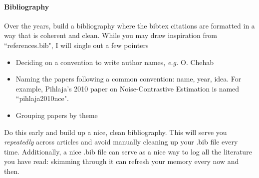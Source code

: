 \paragraph{Bibliography} Over the years, build a bibliography where the bibtex citations are formatted in a way that is coherent and clean. While you may draw inspiration from ``references.bib", I will single out a few pointers
%
\begin{itemize}

    \item Deciding on a convention to write author names, \textit{e.g.} O. Chehab

    \item Naming the papers following a common convention: name, year, idea. For example, Pihlaja's 2010 paper on Noise-Contrastive Estimation is named ``pihlaja2010nce". 

    \item Grouping papers by theme

\end{itemize}
%
Do this early and build up a nice, clean bibliography. This will serve you \textit{repeatedly} across articles and avoid manually cleaning up your .bib file every time. Additionally, a nice .bib file can serve as a nice way to log all the literature you have read: skimming through it can refresh your memory every now and then.